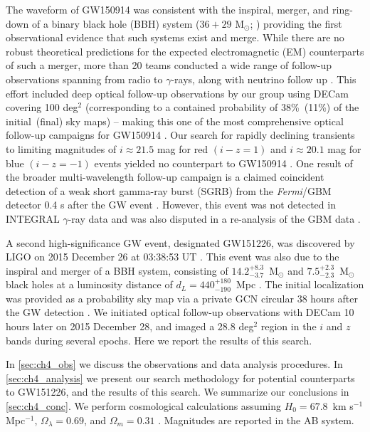The waveform of GW150914 was consistent with the inspiral, merger, and ring-down of a binary black hole (BBH) system ($36+29$ M$_\odot$;  \citealt{LIGOGW150914}) providing the first observational evidence that such systems exist and merge. While there are no robust theoretical predictions for the expected electromagnetic (EM) counterparts of such a merger, more than 20 teams conducted a wide range of follow-up observations spanning from radio to $\gamma$-rays, along with neutrino follow up \citep{LIGOGW150914FollowUp,LIGOGW150914FollowUpSupp,GW150914IceCube,Annis+16,GW150914Fermi,Evans+16,Kasliwal+16,Savchenko+16,GW150914PS1,GW150914DECam,Tavani+16}. This effort included deep optical follow-up observations by our group using DECam covering 100 deg$^2$ (corresponding to a contained probability of 38\%~(11\%) of the initial~(final) sky maps) -- making this one of the most comprehensive optical  follow-up campaigns for GW150914 \citep{Annis+16,GW150914DECam}. Our search for rapidly declining transients to limiting magnitudes of $i\approx21.5$ mag for red $(i-z=1)$ and $i\approx20.1$ mag for blue $(i-z=-1)$ events yielded no counterpart to GW150914 \citep{GW150914DECam}. One result of the broader multi-wavelength follow-up campaign is a claimed coincident detection of a weak short gamma-ray burst (SGRB) from the {\it Fermi}/GBM detector 0.4 s after the GW event \citep{GW150914Fermi}. However, this event was not detected in INTEGRAL $\gamma$-ray data \citep{Savchenko+16} and was also disputed in a re-analysis of the GBM data \citep{Greiner+16}.

A second high-significance GW event, designated GW151226, was discovered by LIGO on 2015 December 26 at 03:38:53 UT \citep{LIGOGW151226}.  This event was also due to the inspiral and merger of a BBH system, consisting  of $14.2^{+8.3}_{-3.7}$~M$_\odot$ and $7.5^{+2.3}_{-2.3}$~M$_\odot$ black holes at a luminosity  distance of $d_L = 440^{+180}_{-190}$~Mpc \citep{LIGOGW151226}. The initial localization was provided as a probability sky map via a private  GCN circular 38 hours after the GW detection \citep{SingerPrice16}. We initiated optical follow-up observations with DECam 10 hours later on 2015 December 28, and imaged a 28.8 deg$^2$ region in the $i$ and $z$ bands during several epochs. Here we report  the results of this search.

In \cref{sec:ch4_obs} we discuss the observations and data analysis procedures. In \cref{sec:ch4_analysis}  we present our search methodology for potential counterparts to GW151226,  and the results of this search. We summarize our conclusions in \cref{sec:ch4_conc}. We perform  cosmological calculations assuming $H_0 = 67.8$~km  s$^{-1}$ Mpc$^{-1}$, $\Omega_{\lambda} = 0.69$, and $\Omega_m = 0.31$ \citep{Planck2016}.  Magnitudes are reported in the AB system.

